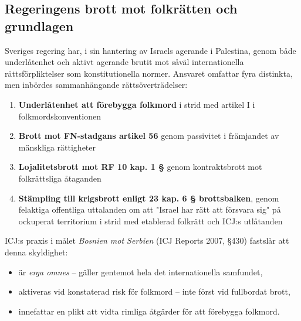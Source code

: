 
\subsection{Regeringens brott mot folkrätten och grundlagen}

\noindent
Sveriges regering har, i sin hantering av Israels agerande i Palestina, genom både underlåtenhet och aktivt agerande brutit mot såväl internationella rättsförpliktelser som konstitutionella normer. Ansvaret omfattar fyra distinkta, men inbördes sammanhängande rättsöverträdelser:

\begin{enumerate}
    \item \textbf{Underlåtenhet att förebygga folkmord} i strid med artikel I i folkmordskonventionen
    \item \textbf{Brott mot FN-stadgans artikel 56} genom passivitet i främjandet av mänskliga rättigheter
    \item \textbf{Lojalitetsbrott mot RF 10 kap. 1 §} genom kontraktsbrott mot folkrättsliga åtaganden
    \item \textbf{Stämpling till krigsbrott enligt 23 kap. 6 § brottsbalken}, genom felaktiga offentliga uttalanden om att "Israel har rätt att försvara sig" på ockuperat territorium i strid med etablerad folkrätt och ICJ:s utlåtanden
\end{enumerate}


\noindent
ICJ:s praxis i målet \textit{Bosnien mot Serbien} (ICJ Reports 2007, §430) fastslår att denna skyldighet:

\begin{itemize}
    \item är \textit{erga omnes} – gäller gentemot hela det internationella samfundet,
    \item aktiveras vid konstaterad risk för folkmord – inte först vid fullbordat brott,
    \item innefattar en plikt att vidta rimliga åtgärder för att förebygga folkmord.
\end{itemize}

\medskip


